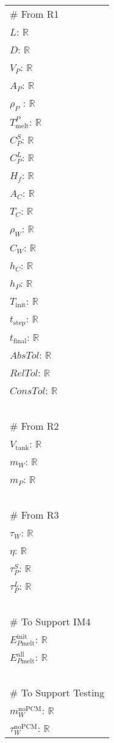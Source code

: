 \documentclass[12pt]{article}
\begin{document}
\renewcommand{\arraystretch}{1.2}
\begin{longtable*}[l]{l} 
\# From R1\\
$L$: $\mathbb{R}$ \\
$D$: $\mathbb{R}$ \\
$V_P$: $\mathbb{R}$ \\
$A_P$: $\mathbb{R}$ \\
$\rho_P$ : $\mathbb{R}$ \\
$T_\text{melt}^{P}$: $\mathbb{R}$ \\
$C^S_P$: $\mathbb{R}$ \\
$C^L_P$: $\mathbb{R}$ \\
$H_f$: $\mathbb{R}$ \\
$A_C$: $\mathbb{R}$ \\
$T_C$: $\mathbb{R}$ \\
$\rho_W$: $\mathbb{R}$ \\
$C_W$: $\mathbb{R}$ \\
$h_C$: $\mathbb{R}$ \\
$h_P$: $\mathbb{R}$ \\
$T_\text{init}$: $\mathbb{R}$ \\
$t_\text{step}$: $\mathbb{R}$ \\
$t_\text{final}$: $\mathbb{R}$ \\
$\mathit{AbsTol}$: $\mathbb{R}$ \\
$\mathit{RelTol}$: $\mathbb{R}$ \\
$\mathit{ConsTol}$: $\mathbb{R}$ \\
~\\
\# From R2\\
$V_\text{tank}$: $\mathbb{R}$ \\
$m_W$: $\mathbb{R}$ \\
$m_P$: $\mathbb{R}$ \\
~\\
\noindent \# From R3\\
$\tau_W$: $\mathbb{R}$ \\
$\eta$: $\mathbb{R}$ \\
$\tau_P^S$: $\mathbb{R}$ \\
$\tau_P^L$: $\mathbb{R}$ \\
~\\
\# To Support IM4\\
$E_{P\text{melt}}^{\text{init}}$: $\mathbb{R}$ \\
$E_{P\text{melt}}^{\text{all}}$: $\mathbb{R}$ \\ 
~\\
\# To Support Testing\\
$m_W^{\text{noPCM}}$: $\mathbb{R}$ \\
$\tau_W^{\text{noPCM}}$: $\mathbb{R}$\\
\end{longtable*}
\end{document}
